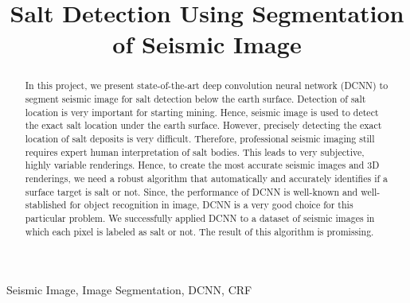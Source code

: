 \documentclass[conference]{IEEEtran}
\begin{document}
\title{Salt Detection Using Segmentation of Seismic Image
}

\author{
}

\maketitle

\begin{abstract}
In this project, we present state-of-the-art deep convolution neural network (DCNN) to segment seismic image for salt detection below the earth surface. Detection of salt location is very important for starting mining. Hence, seismic image is used to detect the exact salt location under the earth surface. However, precisely detecting the exact location of salt deposits is very difficult. Therefore, professional seismic imaging still requires expert human interpretation of salt bodies. This leads to very subjective, highly variable renderings. Hence, to create the most accurate seismic images and 3D renderings, we need a robust algorithm that automatically and accurately identifies if a surface target is salt or not. Since, the performance of DCNN is well-known and well-stablished for object recognition in image, DCNN is a very good choice for this particular problem. We successfully applied DCNN to a dataset of seismic images in which each pixel is labeled as salt or not. The result of this algorithm is promissing.
\end{abstract}

\begin{IEEEkeywords}
Seismic Image, Image Segmentation, DCNN, CRF
\end{IEEEkeywords}
\end{document}
